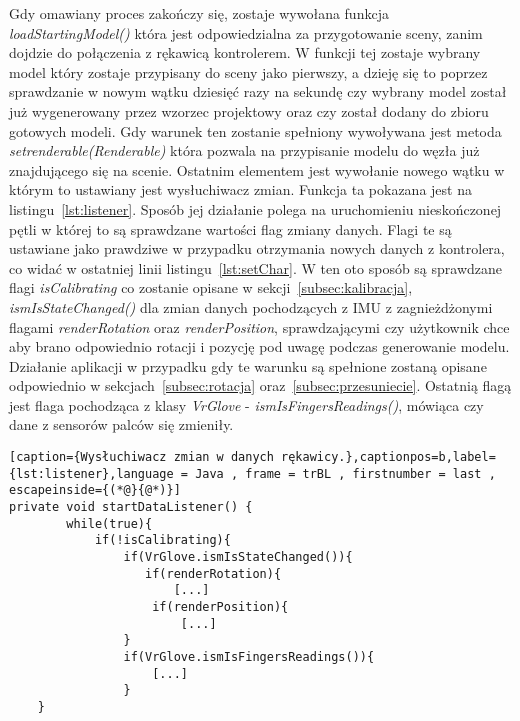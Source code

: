Gdy omawiany proces zakończy się, zostaje wywołana funkcja \textit{loadStartingModel()} która jest odpowiedzialna za przygotowanie sceny, zanim dojdzie do połączenia z rękawicą kontrolerem. W funkcji tej zostaje wybrany model który zostaje przypisany do sceny jako pierwszy, a dzieję się to poprzez sprawdzanie w nowym wątku dziesięć razy na sekundę czy wybrany model został już wygenerowany przez wzorzec projektowy oraz czy został dodany do zbioru gotowych modeli. Gdy warunek ten zostanie spełniony wywoływana jest metoda \textit{setrenderable(Renderable)} która pozwala na przypisanie modelu do węzła już znajdującego się na scenie. Ostatnim elementem jest wywołanie nowego wątku w którym to ustawiany jest wysłuchiwacz zmian. Funkcja ta pokazana jest na listingu~\ref{lst:listener}. Sposób jej działanie polega na uruchomieniu nieskończonej pętli w której to są sprawdzane wartości flag zmiany danych. Flagi te są ustawiane jako prawdziwe w przypadku otrzymania nowych danych z kontrolera, co widać w ostatniej linii listingu~\ref{lst:setChar}. W ten oto sposób są sprawdzane flagi \textit{isCalibrating} co zostanie opisane w sekcji~\ref{subsec:kalibracja}, \textit{ismIsStateChanged()} dla zmian danych pochodzących z IMU z zagnieżdżonymi flagami \textit{renderRotation} oraz \textit{renderPosition}, sprawdzającymi czy użytkownik chce aby brano odpowiednio rotacji i pozycję pod uwagę podczas generowanie modelu. Działanie aplikacji w przypadku gdy te warunku są spełnione zostaną opisane odpowiednio w sekcjach~\ref{subsec:rotacja} oraz~\ref{subsec:przesuniecie}. Ostatnią flagą jest flaga pochodząca z klasy \textit{VrGlove} - \textit{ismIsFingersReadings()}, mówiąca czy dane z sensorów palców się zmieniły. 
\begin{lstlisting}[caption={Wysłuchiwacz zmian w danych rękawicy.},captionpos=b,label={lst:listener},language = Java , frame = trBL , firstnumber = last , escapeinside={(*@}{@*)}]     
private void startDataListener() {
        while(true){
            if(!isCalibrating){
                if(VrGlove.ismIsStateChanged()){
                   if(renderRotation){
                       [...]
                    if(renderPosition){
                        [...]
                }
                if(VrGlove.ismIsFingersReadings()){
                    [...]
         		}       
    }                                            
\end{lstlisting}
	
